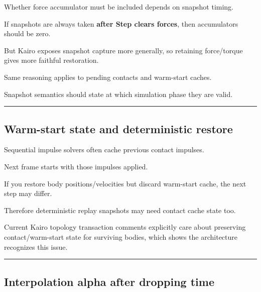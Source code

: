 \hypertarget{06-engine-ii-ch038-accumulated-force-in-snapshots}{}

Whether force accumulator must be included depends on snapshot timing.

If snapshots are always taken \textbf{after Step clears forces}, then accumulators should be zero.

But Kairo exposes snapshot capture more generally, so retaining force/torque gives more faithful restoration.

Same reasoning applies to pending contacts and warm-start caches.

Snapshot semantics should state at which simulation phase they are valid.

\begin{center}\rule{0.5\linewidth}{0.5pt}\end{center}

\subsection{Warm-start state and deterministic restore}\label{06-engine-ii-ch038-warm-start-state-and-deterministic-restore}

\hypertarget{06-engine-ii-ch038-warm-start-state-and-deterministic-restore}{}

Sequential impulse solvers often cache previous contact impulses.

Next frame starts with those impulses applied.

If you restore body positions/velocities but discard warm-start cache, the next step may differ.

Therefore deterministic replay snapshots may need contact cache state too.

Current Kairo topology transaction comments explicitly care about preserving contact/warm-start state for surviving bodies, which shows the architecture recognizes this issue.

\begin{center}\rule{0.5\linewidth}{0.5pt}\end{center}

\subsection{Interpolation alpha after dropping time}\label{06-engine-ii-ch038-interpolation-alpha-after-dropping-time}

\hypertarget{06-engine-ii-ch038-interpolation-alpha-after-dropping-time}{}

